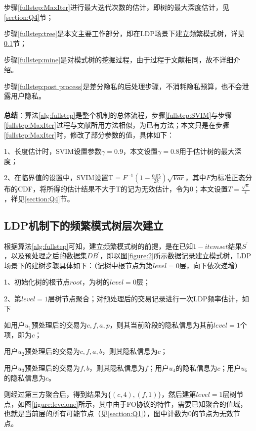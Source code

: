 \documentclass[UTF8,a4paper]{ctexart}
\begin{document}
步骤\ref{fullstep:MaxIter}进行最大迭代次数的估计，即树的最大深度估计，见\ref{section:Q4}节；

步骤\ref{fullstep:tree}是本文主要工作部分，即在LDP场景下建立频繁模式树，详见\ref{setction:buildtree}节；

步骤\ref{fullstep:mine}是对模式树的挖掘过程，由于过程于文献\cite{han2000mining}相同，故不详细介绍。

步骤\ref{fullstep:post process}是差分隐私的后处理步骤，不消耗隐私预算，也不会泄露用户隐私。\\
\\
\textbf{总结}：算法\ref{alg:fullstep}是整个机制的总体流程，步骤\ref{fullstep:SVIM}与步骤\ref{fullstep:MaxIter}过程与文献\cite{wang2018locally}所用方法相似，为已有方法；本文只是在步骤\ref{fullstep:MaxIter}时，修改了部分参数的值，具体如下：

1、长度估计时，SVIM设置参数$\gamma=0.9$，本文设置$\gamma=0.8$用于估计树的最大深度；

2、在临界值的设置中，SVIM设置$\mathrm{T}=F^{-1}\left(1-\frac{0.05}{2 k}\right) \sqrt{V a r}$，其中$F$为标准正态分布的CDF，将所得的估计结果不大于T的记为无效估计，令为0；本文设置$T=\frac{\sqrt{n}}{\epsilon}$，祥见\ref{section:Q4}节。


    \subsection{LDP机制下的频繁模式树层次建立}
    \label{setction:buildtree}
    根据算法\ref{alg:fullstep}可知，建立频繁模式树的前提，是在已知$1-itemset$结果$S^{\prime}$，以及预处理之后的数据集$DB^{\prime}$，即以图\ref{figure:2}所示数据记录建立模式树，LDP场景下的建树步骤具体如下：（记树中根节点为第$level = 0$层，向下依次递增）
    
1、初始化树的根节点$root$，为树的$level=0$层；

2、第$level=1$层树节点聚合；对预处理后的交易记录进行一次LDP频率估计，如下

如用户$u_{1}$预处理后的交易为{\color{red}$c,f,a,p$}，则其当前阶段的隐私信息为其前$level=1$个项，即为$c$；

用户$u_{2}$预处理后的交易为{\color{red}$c,f,a,b$}，则其隐私信息为$c$；

用户$u_{3}$预处理后的交易为{\color{red}$f,b$}，则其隐私信息为$f$；用户$u_{4}$的隐私信息为$c$；用户$u_{5}$的隐私信息为$c$。

则经过第三方聚合后，得到结果为$\{(c,4),(f,1)\}$，然后建第$level=1$层树节点，如图\ref{figure:levelone}所示，其中由于FO协议的特性，需要已知聚合的值域，也就是当前层的所有可能节点（见\ref{section:Q1}），图中计数为0的节点为无效节点。
\end{document}
